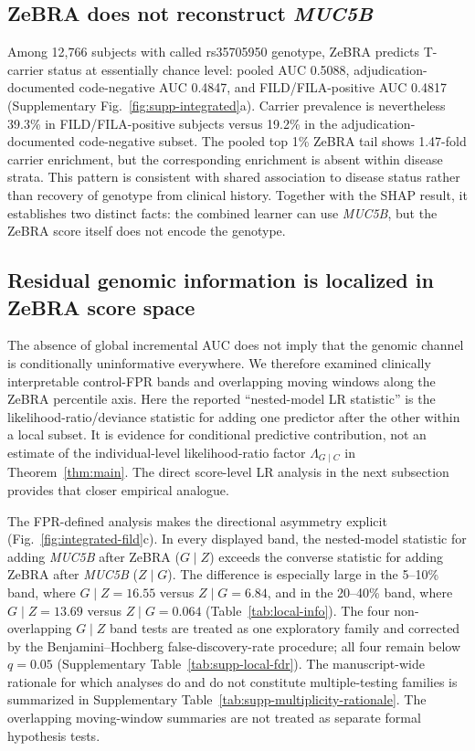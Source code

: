 \subsection{ZeBRA does not reconstruct \textit{MUC5B}}
Among 12,766 subjects with called rs35705950 genotype, ZeBRA predicts T-carrier status at essentially chance level: pooled AUC 0.5088, adjudication-documented code-negative AUC 0.4847, and FILD/FILA-positive AUC 0.4817 (Supplementary Fig.~\ref{fig:supp-integrated}a). Carrier prevalence is nevertheless 39.3\% in FILD/FILA-positive subjects versus 19.2\% in the adjudication-documented code-negative subset. The pooled top 1\% ZeBRA tail shows 1.47-fold carrier enrichment, but the corresponding enrichment is absent within disease strata. This pattern is consistent with shared association to disease status rather than recovery of genotype from clinical history. Together with the SHAP result, it establishes two distinct facts: the combined learner can use \textit{MUC5B}, but the ZeBRA score itself does not encode the genotype.

\subsection{Residual genomic information is localized in ZeBRA score space}
The absence of global incremental AUC does not imply that the genomic channel is conditionally uninformative everywhere. We therefore examined clinically interpretable control-FPR bands and overlapping moving windows along the ZeBRA percentile axis. Here the reported ``nested-model LR statistic'' is the likelihood-ratio/deviance statistic for adding one predictor after the other within a local subset. It is evidence for conditional predictive contribution, not an estimate of the individual-level likelihood-ratio factor $\Lambda_{G\mid C}$ in Theorem~\ref{thm:main}. The direct score-level LR analysis in the next subsection provides that closer empirical analogue.

The FPR-defined analysis makes the directional asymmetry explicit (Fig.~\ref{fig:integrated-fild}c). In every displayed band, the nested-model statistic for adding \textit{MUC5B} after ZeBRA ($G\mid Z$) exceeds the converse statistic for adding ZeBRA after \textit{MUC5B} ($Z\mid G$). The difference is especially large in the 5--10\% band, where $G\mid Z=16.55$ versus $Z\mid G=6.84$, and in the 20--40\% band, where $G\mid Z=13.69$ versus $Z\mid G=0.064$ (Table~\ref{tab:local-info}). The four non-overlapping $G\mid Z$ band tests are treated as one exploratory family and corrected by the Benjamini--Hochberg false-discovery-rate procedure; all four remain below $q=0.05$ (Supplementary Table~\ref{tab:supp-local-fdr}). The manuscript-wide rationale for which analyses do and do not constitute multiple-testing families is summarized in Supplementary Table~\ref{tab:supp-multiplicity-rationale}. The overlapping moving-window summaries are not treated as separate formal hypothesis tests.

